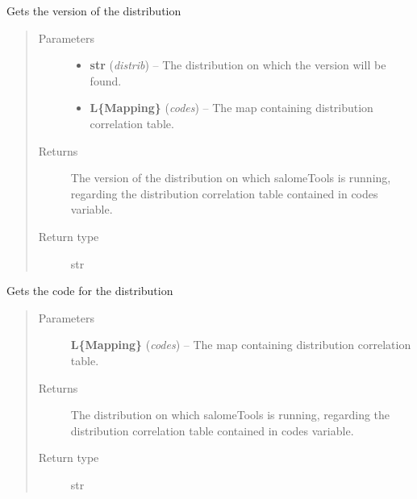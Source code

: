 \documentclass[a4paper,10pt,english]{sphinxmanual}
\begin{document}
\begin{fulllineitems}
\label{commands/apidoc/src:src.architecture.get_distrib_version}
Gets the version of the distribution
\begin{quote}\begin{description}
\item[{Parameters}] \leavevmode\begin{itemize}
\item {} 
\textbf{str} (\emph{distrib}) -- The distribution on which the version will be found.

\item {} 
\textbf{L\{Mapping\}} (\emph{codes}) -- The map containing distribution correlation table.

\end{itemize}

\item[{Returns}] \leavevmode
The version of the distribution on which salomeTools is running, 
regarding the distribution correlation table contained in codes 
variable.

\item[{Return type}] \leavevmode
str

\end{description}\end{quote}

\end{fulllineitems}


\begin{fulllineitems}
\label{commands/apidoc/src:src.architecture.get_distribution}
Gets the code for the distribution
\begin{quote}\begin{description}
\item[{Parameters}] \leavevmode
\textbf{L\{Mapping\}} (\emph{codes}) -- The map containing distribution correlation table.

\item[{Returns}] \leavevmode
The distribution on which salomeTools is running, regarding the 
distribution correlation table contained in codes variable.

\item[{Return type}] \leavevmode
str

\end{description}\end{quote}

\end{fulllineitems}
\end{document}
